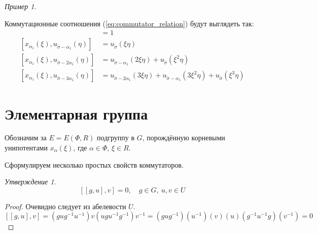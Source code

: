 \documentclass[10pt]{article}
\theoremstyle{remark}
\newtheorem{prop}{Утверждение}
\newtheorem{example}{Пример}
\begin{document}
\begin{example}
\begin{center}
\end{center}

\end{example}

Коммутационные соотношения (\ref{eq:commutator_relation}) будут выглядеть так:
\begin{align*}
[x_{\alpha_1}(\xi), u_{\widetilde\sigma}(\eta)] & = 1\\
[x_{\alpha_1}(\xi), u_{\widetilde\sigma-\alpha_1}(\eta)] & = u_{\widetilde\sigma}(\xi\eta)\\
[x_{\alpha_1}(\xi), u_{\widetilde\sigma-2\alpha_1}(\eta)] & = u_{\widetilde\sigma-\alpha_1}(2\xi\eta)+u_{\widetilde\sigma}(\xi^2\eta)\\
[x_{\alpha_1}(\xi), u_{\widetilde\sigma-3\alpha_1}(\eta)] & = u_{\widetilde\sigma-2\alpha_1}(3\xi\eta)+u_{\widetilde\sigma-\alpha_1}(3\xi^2\eta)+u_{\widetilde\sigma}(\xi^3\eta)
\end{align*}

\section{Элементарная группа}

Обозначим за $E = E(\Phi,R)$ подгруппу в $G$, порождённую корневыми унипотентами $x_\alpha(\xi)$, где $\alpha \in \Phi$, $\xi \in R$.

Сформулируем несколько простых свойств коммутаторов.

\begin{prop}
  $$[[g,u],v] = 0, \quad g \in G, \ u,v \in U $$
\end{prop}
\begin{proof}
  Очевидно следует из абелевости $U$.
  $$ [[g,u],v] = (g u g^{-1} u^{-1}) v (u g u^{-1} g^{-1}) v^{-1} = (gug^{-1}) (u^{-1}) (v) (u) (g^{-1}u^{-1}g) (v^{-1}) = 0$$
\end{proof}
\end{document}
